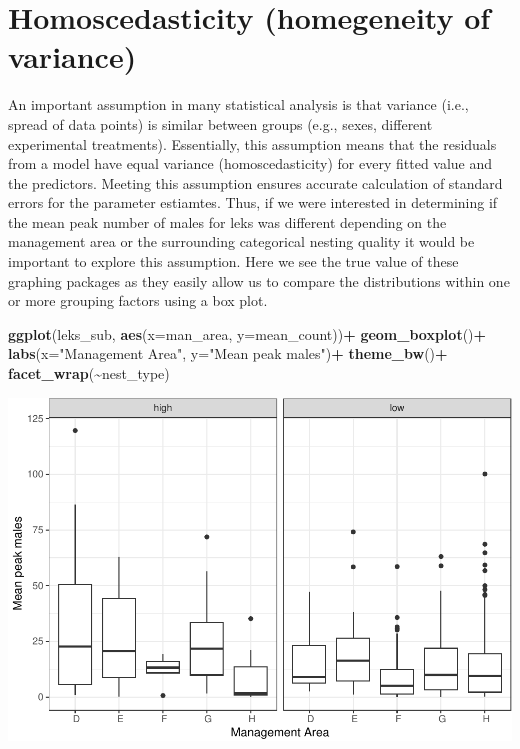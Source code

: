 \documentclass[
]{book}
\newenvironment{Shaded}{\begin{snugshade}}{\end{snugshade}}
\newcommand{\AttributeTok}[1]{\textcolor[rgb]{0.13,0.29,0.53}{#1}}
\newcommand{\FunctionTok}[1]{\textcolor[rgb]{0.13,0.29,0.53}{\textbf{#1}}}
\newcommand{\NormalTok}[1]{#1}
\newcommand{\SpecialCharTok}[1]{\textcolor[rgb]{0.81,0.36,0.00}{\textbf{#1}}}
\newcommand{\StringTok}[1]{\textcolor[rgb]{0.31,0.60,0.02}{#1}}
\begin{document}
\hypertarget{homoscedasticity-homegeneity-of-variance}{%
\section{Homoscedasticity (homegeneity of variance)}\label{homoscedasticity-homegeneity-of-variance}}

An important assumption in many statistical analysis is that variance (i.e., spread of data points) is similar between groups (e.g., sexes, different experimental treatments). Essentially, this assumption means that the residuals from a model have equal variance (homoscedasticity) for every fitted value and the predictors. Meeting this assumption ensures accurate calculation of standard errors for the parameter estiamtes. Thus, if we were interested in determining if the mean peak number of males for leks was different depending on the management area or the surrounding categorical nesting quality it would be important to explore this assumption. Here we see the true value of these graphing packages as they easily allow us to compare the distributions within one or more grouping factors using a box plot.

\begin{Shaded}
\begin{Highlighting}[]
\FunctionTok{ggplot}\NormalTok{(leks\_sub, }\FunctionTok{aes}\NormalTok{(}\AttributeTok{x=}\NormalTok{man\_area, }\AttributeTok{y=}\NormalTok{mean\_count))}\SpecialCharTok{+}
    \FunctionTok{geom\_boxplot}\NormalTok{()}\SpecialCharTok{+}
    \FunctionTok{labs}\NormalTok{(}\AttributeTok{x=}\StringTok{"Management Area"}\NormalTok{, }\AttributeTok{y=}\StringTok{"Mean peak males"}\NormalTok{)}\SpecialCharTok{+}
    \FunctionTok{theme\_bw}\NormalTok{()}\SpecialCharTok{+}
    \FunctionTok{facet\_wrap}\NormalTok{(}\SpecialCharTok{\textasciitilde{}}\NormalTok{nest\_type)}
\end{Highlighting}
\end{Shaded}

\includegraphics{series_files/figure-latex/unnamed-chunk-34-1.pdf}
\end{document}
